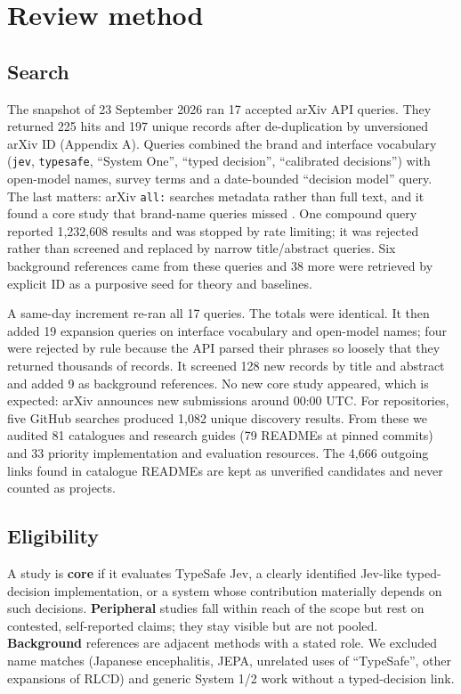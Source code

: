 \section{Review method}\label{sec:review-method}

\subsection{Search}

The snapshot of 23 September 2026 ran 17 accepted arXiv API queries. They returned 225 hits and 197 unique records after de-duplication by unversioned arXiv ID (Appendix A). Queries combined the brand and interface vocabulary (\texttt{jev}, \texttt{typesafe}, “System One”, “typed decision”, “calibrated decisions”) with open-model names, survey terms and a date-bounded “decision model” query. The last matters: arXiv \texttt{all:} searches metadata rather than full text, and it found a core study that brand-name queries missed \citep{arxiv2609_24574}. One compound query reported 1,232,608 results and was stopped by rate limiting; it was rejected rather than screened and replaced by narrow title/abstract queries. Six background references came from these queries and 38 more were retrieved by explicit ID as a purposive seed for theory and baselines.

A same-day increment re-ran all 17 queries. The totals were identical. It then added 19 expansion queries on interface vocabulary and open-model names; four were rejected by rule because the API parsed their phrases so loosely that they returned thousands of records. It screened 128 new records by title and abstract and added 9 as background references. No new core study appeared, which is expected: arXiv announces new submissions around 00:00 UTC. For repositories, five GitHub searches produced 1,082 unique discovery results. From these we audited 81 catalogues and research guides (79 READMEs at pinned commits) and 33 priority implementation and evaluation resources. The 4,666 outgoing links found in catalogue READMEs are kept as unverified candidates and never counted as projects.

\subsection{Eligibility}

A study is \textbf{core} if it evaluates TypeSafe Jev, a clearly identified Jev-like typed-decision implementation, or a system whose contribution materially depends on such decisions. \textbf{Peripheral} studies fall within reach of the scope but rest on contested, self-reported claims; they stay visible but are not pooled. \textbf{Background} references are adjacent methods with a stated role. We excluded name matches (Japanese encephalitis, JEPA, unrelated uses of “TypeSafe”, other expansions of RLCD) and generic System 1/2 work without a typed-decision link.

